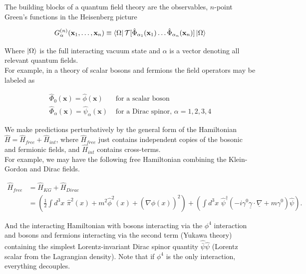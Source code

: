 
\noindent The building blocks of a quantum field theory are the observables, $n$-point Green's functions in the Heisenberg picture

\begin{equation}
G^{(n)}_{\alpha} (\textbf{x}_1, \dots, \textbf{x}_n) \equiv \bra{\Omega} \mathcal{T} [ \hat{\Phi}_{\alpha_1} (\textbf{x}_1) \dots \hat{\Phi}_{\alpha_n} (\textbf{x}_n) ] \ket{\Omega}
\end{equation}

\noindent Where $\ket{\Omega}$ is the full interacting vacuum state and $\alpha$ is a vector denoting all relevant quantum fields. \\
\noindent For example, in a theory of scalar bosons and fermions the field operators may be labeled as

\begin{align*}
\hat{\Phi}_0 (\textbf{x}) = \hat{\phi}(\textbf{x}) &\text{  for a scalar boson} \\
\hat{\Phi}_\alpha (\textbf{x}) = \hat{\psi}_\alpha (\textbf{x}) &\text{  for a Dirac spinor, }  \alpha = 1, 2, 3, 4
\end{align*}

\noindent We make predictions perturbatively by the general form of the Hamiltonian $\hat{H} = \hat{H}_{free} + \hat{H}_{int}$, where $\hat{H}_{free}$ just contains independent copies of the bosonic and fermionic fields, and $\hat{H}_{int}$ contains cross-terms. \\

\noindent For example, we may have the following free Hamiltonian combining the Klein-Gordon and Dirac fields.

\begin{align}
\hat{H}_{free} &= \hat{H}_{KG} + \hat{H}_{Dirac} \\
&= \left( \frac{1}{2} \int d^3 x \,\, \hat{\pi}^2 (x) + m^2 \hat{\phi}^2 (x) + (\nabla \hat{\phi} (x) )^2 \right) + \left( \int d^3 x \,\, \hat{\psi}^\dagger ( -i \gamma^0 \underline{\gamma} \cdot \underline{\nabla} + m \gamma^0 ) \hat{\psi} \right) .
\end{align}

\noindent And the interacting Hamiltonian with bosons interacting via the $\phi^4$ interaction and bosons and fermions interacting via the second term (Yukawa theory) containing the simplest Lorentz-invariant Dirac spinor quantity $\hat{\bar{\psi}} \hat{\psi}$ (Lorentz scalar from the Lagrangian density). Note that if $\phi^4$ is the only interaction, everything decouples.

